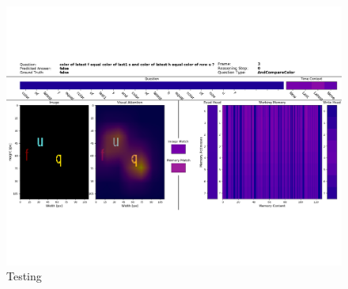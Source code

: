 \documentclass{article}
\theoremstyle{remark}
\theoremstyle{definition}
\begin{document}
\begin{figure}[ht]
	\centering
	\includegraphics[width=\textwidth]{img/visualization}
	\caption{Testing}
	\label{fig:visualization}
\end{figure}



\newpage

\end{document}

